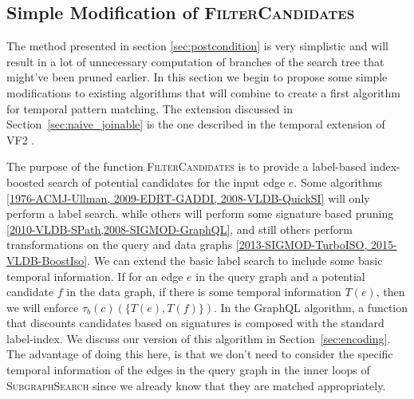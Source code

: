 \subsection{Simple Modification of \textsc{FilterCandidates}}
\label{sec:naive_filter_candidates}

The method presented in section \ref{sec:postcondition} is very simplistic and
will result in a lot of unnecessary computation of branches of the search tree
that might've been pruned earlier. In this section we begin to propose some
simple modifications to existing algorithms that will combine to create a first
algorithm for temporal pattern matching. The extension discussed in
Section~\ref{sec:naive_joinable} is the one described in the temporal extension
of VF2 \cite{2016-arXiv-TemporalIso}.

The purpose of the function \textsc{FilterCandidates} is to provide a
label-based index-boosted search of potential candidates for the input edge
$e$. Some algorithms \ref{1976-ACMJ-Ullman, 2009-EDBT-GADDI, 2008-VLDB-QuickSI}
will only perform a label search. while others will perform some signature based
pruning \ref{2010-VLDB-SPath,2008-SIGMOD-GraphQL}, and still others perform
transformations on the query and data graphs \ref{2013-SIGMOD-TurboISO, 2015-VLDB-BoostIso}. We can
extend the basic label search to include some basic temporal information. If for
an edge $e$ in the query graph and a potential candidate $f$ in the data graph,
if there is some temporal information $T(e)$, then we will enforce
$\tau_b(c)(\{T(e), T(f)\})$. In the GraphQL algorithm, a function that discounts
candidates based on signatures is composed with the standard label-index. We
discuss our version of this algorithm in Section~\ref{sec:encoding}. The
advantage of doing this here, is that we don't need to consider the specific
temporal information of the edges in the query graph in the inner loops of
\textsc{SubgraphSearch} since we already know that they are matched
appropriately.

